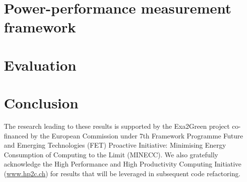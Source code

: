 \documentclass[twocolumn]{svjour3}
\DeclareRobustCommand\IPCClongname{}
\begin{document}
\section{Power-performance measurement framework}
\label{sec:3}


\section{Evaluation}
\label{sec:4}


\section{Conclusion}
\label{concl}



\begin{acknowledgements}
The research  leading to these  results is supported by  the Exa2Green
project  co-financed by  the European  Commission under  7th Framework
Programme Future and Emerging Technologies (FET) Proactive Initiative:
Minimising Energy  Consumption of Computing to the  Limit (MINECC). We
also gratefully acknowledge the High Performance and High Productivity
Computing  Initiative  (\url{www.hp2c.ch}) for  results  that will  be
leveraged in subsequent code refactoring.
\end{acknowledgements}

\DeclareRobustCommand\IPCClongname{ - Intergovernmental Panel on Climate Change}



\end{document}
